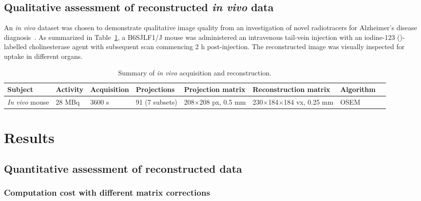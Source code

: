 \documentclass[utf8]{FrontiersinHarvard} %
\begin{document}
\subsection{Qualitative assessment of reconstructed \textit{in vivo} data}

An \textit{in vivo} dataset was chosen to demonstrate qualitative image quality from an investigation of novel radiotracers for Alzheimer's disease diagnosis~\cite{debay}. As summarized in Table~\ref{tab:invivo_summary}, a B6SJLF1/J mouse was administered an intravenous tail-vein injection with an iodine-123 ()-labelled cholinesterase agent with subsequent scan commencing 2 h post-injection. The reconstructed image was visually inspected for uptake in different organs.

\begin{table}[h!]
\caption{Summary of \textit{in vivo} acquisition and reconstruction.\label{tab:invivo_summary}}
\footnotesize
\begin{tabular}{l l l l l l l l}
	\hline
	Subject & Activity & Acquisition & Projections & Projection matrix & Reconstruction matrix & Algorithm\\ \hline
	
	\textit{In vivo} mouse & 28 MBq & 3600 s & 91 (7 subsets) & 208$\times$208 px, 0.5 mm & 230$\times$184$\times$184 vx, 0.25 mm & OSEM	\\ \hline
\end{tabular}
\end{table}

\section{Results}



\subsection{Quantitative assessment of reconstructed data}

\subsubsection{Computation cost with different matrix corrections}
\end{document}
